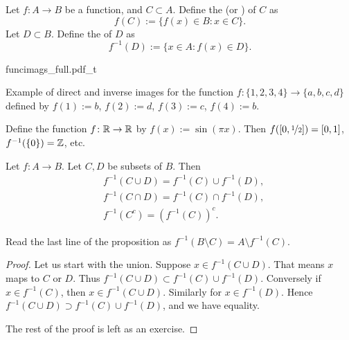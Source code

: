 \begin{defn}
Let $f \colon A \to B$ be a function, and $C \subset A$.  Define
the \emph{} (or \emph{}) of $C$ as
\begin{equation*}
f(C) := \bigl\{ f(x) \in B : x \in C \bigr\} .
\end{equation*}
Let $D \subset B$.  Define the \emph{} of $D$ as
\begin{equation*}
f^{-1}(D) := \bigl\{ x \in A : f(x) \in D \bigr\} .
\end{equation*}
\end{defn}
\begin{myfigureht}
{funcimags_full.pdf_t}
\caption{Example of direct and inverse images for the function
$f \colon \{ 1,2,3,4 \} \to \{ a,b,c,d \}$ defined by
$f(1) := b$,
$f(2) := d$,
$f(3) := c$,
$f(4) := b$.\label{figfuncimags}}
\end{myfigureht}

\begin{example}
Define the function $f \colon {\mathbb{R}} \to {\mathbb{R}}$ by
$f(x) := \sin(\pi x)$.  Then $f([0,\nicefrac{1}{2}]) = [0,1]$, 
$f^{-1}(\{0\}) = {\mathbb{Z}}$, etc.
\end{example}

\begin{prop} \label{st:propinv}
Let $f \colon A \to B$.  Let $C, D$ be subsets of $B$.  Then
\begin{align*}
& f^{-1}( C \cup D) = f^{-1} (C) \cup f^{-1} (D) , \\
& f^{-1}( C \cap D) = f^{-1} (C) \cap f^{-1} (D) , \\
& f^{-1}( C^c) = {\left( f^{-1} (C) \right)}^c .
\end{align*}
\end{prop}

Read the last line of the proposition as
$f^{-1}( B \setminus C) = A \setminus f^{-1} (C)$.

\begin{proof}
Let us start with the union.  Suppose $x \in 
f^{-1}( C \cup D)$.  That means 
$x$ maps to $C$ or $D$.  Thus
$f^{-1}( C \cup D) \subset f^{-1} (C) \cup f^{-1} (D)$.  Conversely
if $x \in f^{-1}(C)$, then $x \in f^{-1}(C \cup D)$.  Similarly for
$x \in f^{-1}(D)$.  Hence
$f^{-1}( C \cup D) \supset f^{-1} (C) \cup f^{-1} (D)$, and we have
equality.

The rest of the proof is left as an exercise.
\end{proof}

